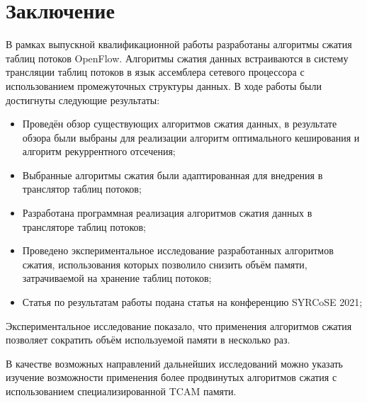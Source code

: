 \documentclass[oneside,final,12pt]{extarticle}
\begin{document}
    \section{Заключение}
    В рамках выпускной квалификационной работы разработаны алгоритмы сжатия 
    таблиц потоков OpenFlow.
    Алгоритмы сжатия данных встраиваются в систему трансляции таблиц потоков
    в язык ассемблера сетевого процессора с использованием промежуточных структуры данных. 
    В ходе работы были достигнуты следующие результаты:
    \begin{itemize}
        \item Проведён обзор существующих алгоритмов сжатия данных, в результате обзора были выбраны для реализации алгоритм оптимального кеширования и алгоритм рекуррентного отсечения;
        \item Выбранные алгоритмы сжатия были адаптированная для внедрения в транслятор таблиц потоков;
        \item Разработана программная реализация алгоритмов сжатия данных в трансляторе таблиц потоков;
        \item Проведено экспериментальное исследование разработанных алгоритмов сжатия, использования которых позволило снизить объём памяти, затрачиваемой на хранение таблиц потоков;
        \item Статья по результатам работы подана статья на конференцию SYRCoSE 2021;
    \end{itemize}

    Экспериментальное исследование показало, что применения алгоритмов сжатия позволяет сократить объём используемой памяти в несколько раз.

        В качестве возможных направлений дальнейших исследований можно указать изучение 
        возможности применения более продвинутых алгоритмов сжатия с использованием специализированной TCAM памяти.
\printbibliography{}
%
\end{document}
